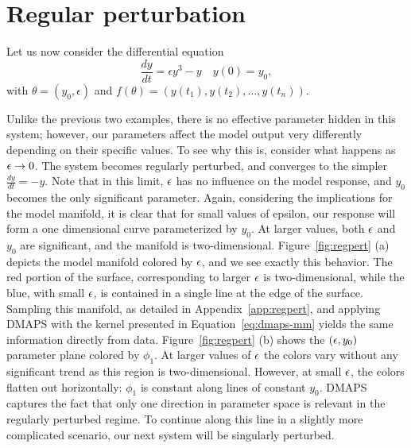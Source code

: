 \section{Regular perturbation}

Let us now consider the differential equation
%
\begin{equation}
 \frac{dy}{dt} = \epsilon y^3 - y
\quad
 y(0) = y_0 ,
\label{1D-model-regpert}
\end{equation}
%
with $\theta = (y_0, \epsilon)$ and $f(\theta) = \left(y(t_1), y(t_2), \dots,
  y(t_n) \right)$.

Unlike the previous two examples, there is no effective parameter
hidden in this system; however, our parameters affect the model output
very differently depending on their specific values. To see why this
is, consider what happens as $\epsilon \rightarrow 0$. The system becomes
regularly perturbed, and converges to the simpler
$\frac{dy}{dt} = -y$. Note that in this limit, $\epsilon$ has no influence
on the model response, and $y_0$ becomes the only significant
parameter. Again, considering the implications for the model manifold,
it is clear that for small values of epsilon, our response will form a
one dimensional curve parameterized by $y_0$. At larger values, both
$\epsilon$ and $y_0$ are significant, and the manifold is
two-dimensional. Figure~\ref{fig:regpert} (a) depicts the model
manifold colored by $\epsilon$, and we see exactly this behavior. The red
portion of the surface, corresponding to larger $\epsilon$ is
two-dimensional, while the blue, with small $\epsilon$, is contained in a
single line at the edge of the surface. Sampling this manifold, as
detailed in Appendix~\ref{app:regpert}, and applying DMAPS with the
kernel presented in Equation~\ref{eq:dmaps-mm} yields the same
information directly from data. Figure~\ref{fig:regpert} (b) shows the
$(\epsilon, y_0)$ parameter plane colored by $\phi_1$. At larger values of
$\epsilon$ the colors vary without any significant trend as this region is
two-dimensional. However, at small $\epsilon$, the colors flatten out
horizontally: $\phi_1$ is constant along lines of constant
$y_0$. DMAPS captures the fact that only one direction in parameter
space is relevant in the regularly perturbed regime. To continue along
this line in a slightly more complicated scenario, our next system
will be singularly perturbed.


